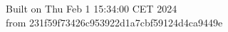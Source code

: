 {\noindent Built on Thu Feb  1 15:34:00 CET 2024} \\ 
 {\noindent from 231f59f73426c953922d1a7cbf59124d4ca9449e}
